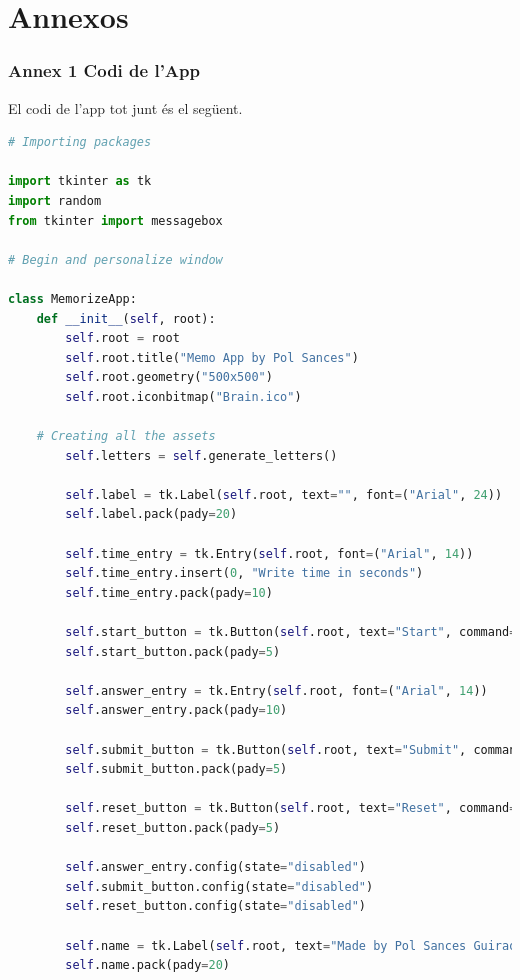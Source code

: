 \part*{Annexos}

\section*{Annex 1 Codi de l'App}

El codi de l'app tot junt és el següent.

\begin{lstlisting}[language=Python, style=colorEX, caption=Python example]
    # Importing packages

import tkinter as tk
import random
from tkinter import messagebox

# Begin and personalize window

class MemorizeApp:
    def __init__(self, root):
        self.root = root
        self.root.title("Memo App by Pol Sances")
        self.root.geometry("500x500")
        self.root.iconbitmap("Brain.ico")

    # Creating all the assets
        self.letters = self.generate_letters()

        self.label = tk.Label(self.root, text="", font=("Arial", 24))
        self.label.pack(pady=20)

        self.time_entry = tk.Entry(self.root, font=("Arial", 14))
        self.time_entry.insert(0, "Write time in seconds")
        self.time_entry.pack(pady=10)

        self.start_button = tk.Button(self.root, text="Start", command=self.start_memorize)
        self.start_button.pack(pady=5)

        self.answer_entry = tk.Entry(self.root, font=("Arial", 14))
        self.answer_entry.pack(pady=10)

        self.submit_button = tk.Button(self.root, text="Submit", command=self.check_answers)
        self.submit_button.pack(pady=5)

        self.reset_button = tk.Button(self.root, text="Reset", command=self.reset)
        self.reset_button.pack(pady=5)

        self.answer_entry.config(state="disabled")
        self.submit_button.config(state="disabled")
        self.reset_button.config(state="disabled")

        self.name = tk.Label(self.root, text="Made by Pol Sances Guirao", font=("Arial", 8))
        self.name.pack(pady=20)


\end{lstlisting}
